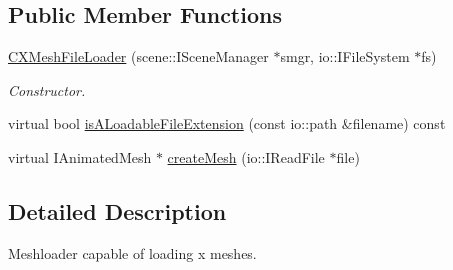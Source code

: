\subsection*{Public Member Functions}
\begin{DoxyCompactItemize}
\item 
\hypertarget{classirr_1_1scene_1_1_c_x_mesh_file_loader_a282f17a8e9f4de6efa1e3d3239e790b4}{\hyperlink{classirr_1_1scene_1_1_c_x_mesh_file_loader_a282f17a8e9f4de6efa1e3d3239e790b4}{C\-X\-Mesh\-File\-Loader} (scene\-::\-I\-Scene\-Manager $\ast$smgr, io\-::\-I\-File\-System $\ast$fs)}\label{classirr_1_1scene_1_1_c_x_mesh_file_loader_a282f17a8e9f4de6efa1e3d3239e790b4}

\begin{DoxyCompactList}\small\item\em Constructor. \end{DoxyCompactList}\item 
virtual bool \hyperlink{classirr_1_1scene_1_1_c_x_mesh_file_loader_abc7a203fde0bca2efbeb8519c5300678}{is\-A\-Loadable\-File\-Extension} (const io\-::path \&filename) const 
\item 
virtual I\-Animated\-Mesh $\ast$ \hyperlink{classirr_1_1scene_1_1_c_x_mesh_file_loader_a6ff5e557772486a5ee756d6f8435dbaa}{create\-Mesh} (io\-::\-I\-Read\-File $\ast$file)
\end{DoxyCompactItemize}


\subsection{Detailed Description}
Meshloader capable of loading x meshes. 

